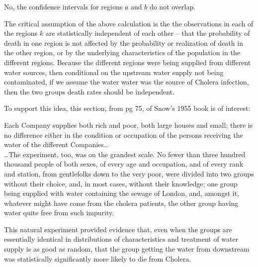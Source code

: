 \documentclass[12pt]{article}
\begin{document}
No, the confidence intervals for regions $a$ and $b$ do not overlap.


\vem
{}

The critical assumption of the above calculation is the the observations in each of the regions $k$ are statistically independent of each other -- that the probability of death in one region is not affected by the probability or realization of death in the other region, or by the underlying characteristics of the population in the different regions. Because the different regions were being supplied from different water sources, then conditional on the upstream water supply not being contaminated, if we assume the water water was the source of Cholera infection, then the two groups death rates should be independent. 

To support this idea, this section, from pg 75, of Snow's 1955 book is of interest:

\begin{displayquote}
Each Company supplies both rich and poor, both large houses and small; there is no difference either in the condition or occupation of the persons receiving the water of the different Companies\dots\\[-1em]

\dots The experiment, too, was on the grandest scale. No fewer than three hundred thousand people of both sexes, of every age and occupation, and of every rank and station, from gentlefolks down to the very poor, were divided into two groups without their choice, and, in most cases, without their knowledge; one group being supplied with water containing the sewage of London, and, amongst it,  whatever might have come from the cholera patients, the other group having water quite free from such impurity.
\end{displayquote}

This natural experiment provided evidence that, even when the groups are essentially identical in distributions of characteristics and treatment of water supply is as good as random, that the group getting the water from downstream was statistically significantly more likely to die from Cholera.
\end{document}
